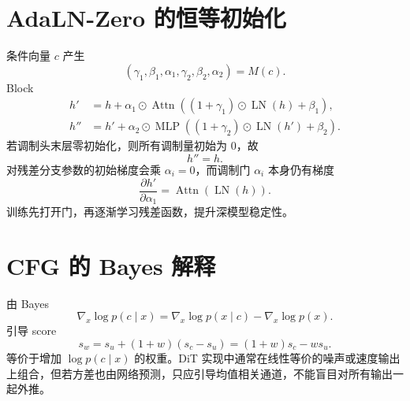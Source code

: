 \documentclass[UTF8,12pt,a4paper,fontset=none]{ctexart}
\numberwithin{equation}{section}
\begin{document}
\section{AdaLN-Zero 的恒等初始化}
条件向量 $c$ 产生
\begin{equation}
 (\gamma_1,\beta_1,\alpha_1,
 \gamma_2,\beta_2,\alpha_2)=M(c).
\end{equation}
Block
\begin{align}
 h'&=h+\alpha_1\odot
 \operatorname{Attn}((1+\gamma_1)\odot\operatorname{LN}(h)+\beta_1),\\
 h''&=h'+\alpha_2\odot
 \operatorname{MLP}((1+\gamma_2)\odot\operatorname{LN}(h')+\beta_2).
\end{align}
若调制头末层零初始化，则所有调制量初始为 0，故
\begin{equation}
 h''=h.
\end{equation}
对残差分支参数的初始梯度会乘 $\alpha_i=0$，而调制门 $\alpha_i$ 本身仍有梯度
\begin{equation}
 \frac{\partial h'}{\partial\alpha_1}=\operatorname{Attn}(\operatorname{LN}(h)).
\end{equation}
训练先打开门，再逐渐学习残差函数，提升深模型稳定性。

\section{CFG 的 Bayes 解释}
由 Bayes
\begin{equation}
 \nabla_x\log p(c\mid x)
 =\nabla_x\log p(x\mid c)-\nabla_x\log p(x).
\end{equation}
引导 score
\begin{equation}
 s_w=s_u+(1+w)(s_c-s_u)
 =(1+w)s_c-ws_u.
\end{equation}
等价于增加 $\log p(c\mid x)$ 的权重。DiT 实现中通常在线性等价的噪声或速度输出上组合，但若方差也由网络预测，只应引导均值相关通道，不能盲目对所有输出一起外推。
\clearpage
\end{document}
